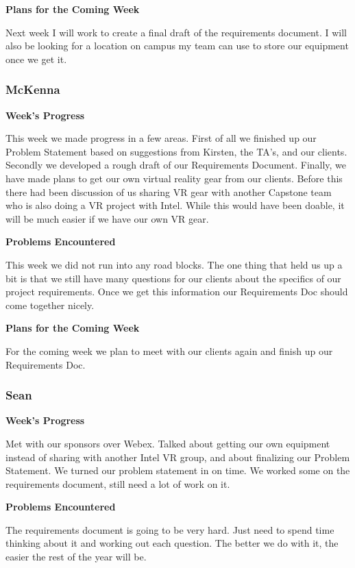 \documentclass[10pt,journal,compsoc,onecolumn, draftclsnofoot]{IEEEtran}
\begin{document}
\noindent \textbf{Plans for the Coming Week}

Next week I will work to create a final draft of the requirements document. I will also be looking for a location on campus my team can use to store our equipment once we get it.

\subsubsection{McKenna}
\noindent \textbf{Week's Progress}

This week we made progress in a few areas. First of all we finished up our Problem Statement based on suggestions from Kirsten, the TA's, and our clients. Secondly we developed a rough draft of our Requirements Document. Finally, we have made plans to get our own virtual reality gear from our clients. Before this there had been discussion of us sharing VR gear with another Capstone team who is also doing a VR project with Intel. While this would have been doable, it will be much easier if we have our own VR gear.

\noindent \textbf{Problems Encountered}

This week we did not run into any road blocks. The one thing that held us up a bit is that we still have many questions for our clients about the specifics of our project requirements. Once we get this information our Requirements Doc should come together nicely.

\noindent \textbf{Plans for the Coming Week}

For the coming week we plan to meet with our clients again and finish up our Requirements Doc.

\subsubsection{Sean}
\noindent \textbf{Week's Progress}

Met with our sponsors over Webex.  Talked about getting our own equipment instead of sharing with another Intel VR group, and about finalizing our Problem Statement.  We turned our problem statement in on time.  We worked some on the requirements document, still need a lot of work on it.

\noindent \textbf{Problems Encountered}

The requirements document is going to be very hard.  Just need to spend time thinking about it and working out each question.  The better we do with it, the easier the rest of the year will be.
\end{document}
